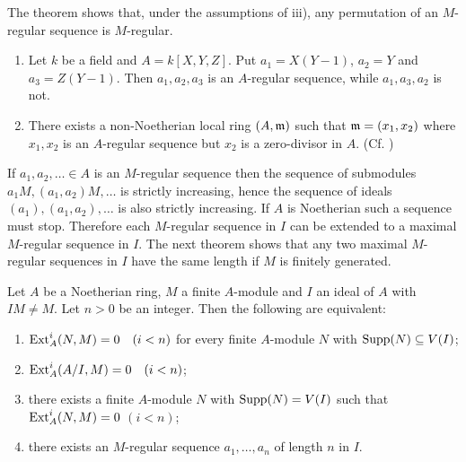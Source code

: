\documentclass[../main]{subfiles}
\begin{document}
The theorem shows that, under the assumptions of iii), any permutation of an $M$-regular sequence is $M$-regular.

\begin{examples*}
\begin{enumerate}
    \item Let $k$ be a field and $A=k[X, Y, Z]$. Put $a_1=X(Y-1)$, $a_2=Y$ and $a_3=Z(Y-1)$. Then $a_1, a_2, a_3$ is an $A$-regular sequence, while $a_1, a_3, a_2$ is not.
    \item There exists a non-Noetherian local ring $(A, \mathfrak{m})$ such that $\mathfrak{m}=(x_1, x_2)$ where $x_1, x_2$ is an $A$-regular sequence but $x_2$ is a zero-divisor in $A$. (Cf. \cite{dieudonne1966on})
\end{enumerate} 
\end{examples*}

\newparagraph If $a_1, a_2, \ldots \in A$ is an $M$-regular sequence then the sequence of submodules $a_1M,(a_1, a_2) M, \ldots$ is strictly increasing, hence the sequence of ideals $(a_1),(a_1, a_2), \ldots$ is also strictly increasing. If $A$ is Noetherian such a sequence must stop. Therefore each $M$-regular sequence in $I$ can be extended to a maximal $M$-regular sequence in $I$. The next theorem shows that any two maximal $M$-regular sequences in $I$ have the same length if $M$ is finitely generated.

\begin{theorem}\label{thm:028}
Let $A$ be a Noetherian ring, $M$ a finite $A$-module and $I$ an ideal of $A$ with $I M \neq M$. Let $n>0$ be an integer. Then the following are equivalent:
\begin{enumerate}[label=(\arabic*)]
    \item $\Ext_A^i(N, M)=0\for{i<n}$ for every finite $A$-module $N$ with $\operatorname{Supp}(N) \subseteq V(I)$;
    \item $\Ext_A^i(A / I, M)=0\for{i<n}$;
    \item there exists a finite $A$-module $N$ with $\operatorname{Supp}(N)=V(I)$ such that \newline $\operatorname{Ext}_A^i(N, M)=0$ $(i<n)$;
    \item there exists an $M$-regular sequence $a_1, \ldots, a_n$ of length $n$ in $I$.
\end{enumerate} 
\end{theorem}
\end{document}
